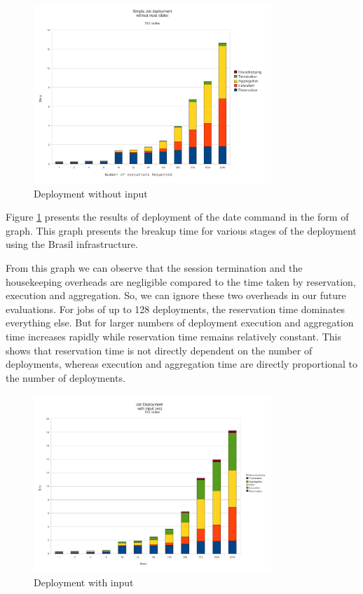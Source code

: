 \begin{figure}
  \begin{center}
    \leavevmode
      \includegraphics[height=0.4\textheight,width=0.8\textwidth]
		{./img/date_graph}
    \caption{Deployment without input}
    \label{fig:date_graph}
  \end{center}
\end{figure}

Figure \ref{fig:date_graph} presents the results of deployment of the date
command in the form of graph.  This graph presents the breakup time for various
stages of the deployment using the Brasil infrastructure.

From this graph we can observe that the session termination and the housekeeping
overheads are negligible compared to the time taken by reservation, execution
and aggregation.  So, we can ignore these two overheads in our future
evaluations.  For jobs of up to 128 deployments, the reservation time dominates
everything else.  But for larger numbers of deployment execution and
aggregation time increases rapidly while reservation time remains relatively
constant. This shows that reservation time is not directly dependent on
the number of deployments, whereas execution and aggregation time are directly
proportional to the number of deployments.

\begin{figure}
  \begin{center}
    \leavevmode
      \includegraphics[height=0.4\textheight,width=0.8\textwidth]
		{./img/wc_graph}
    \caption{Deployment with input}
    \label{fig:wc_graph}
  \end{center}
\end{figure}

